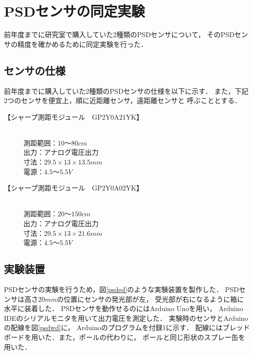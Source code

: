 \documentclass[10pt,a4j]{jarticle}
\begin{document}




\section{PSDセンサの同定実験}
\label{psdex}

前年度までに研究室で購入していた2種類のPSDセンサについて，
そのPSDセンサの精度を確かめるために同定実験を行った．

\subsection{センサの仕様}
前年度までに購入していた2種類のPSDセンサの仕様を以下に示す．
また，下記2つのセンサを便宜上，順に近距離センサ，遠距離センサと
呼ぶこととする．\\

 \begin{description}
  \item[【シャープ測距モジュール　GP2Y0A21YK】] \mbox{} \\
	     測距範囲：$10〜80\unit{cm}$ \\
	     出力：アナログ電圧出力 \\
	     寸法：$29.5×13×13.5\unit{mm}$ \\
	     電源：$4.5〜5.5\unit{V}$
  \item[【シャープ測距モジュール　GP2Y0A02YK】] \mbox{} \\
	     測距範囲：$20〜150\unit{cm}$ \\
	     出力：アナログ電圧出力 \\
	     寸法：$29.5×13×21.6\unit{mm}$ \\
	     電源：$4.5〜5.5\unit{V}$
 \end{description}


\subsection{実験装置}
PSDセンサの実験を行うため，図\ref{psded}のような実験装置を製作した．
PSDセンサは高さ$20\unit{mm}$の位置にセンサの発光部が左，
受光部が右になるように箱に水平に装着した．
PSDセンサを動作せるのにはArduino Unoを用い，
Arduino IDEのシリアルモニタを用いて出力電圧を測定した．
実験時のセンサとArduinoの配線を図\ref{psdwd}に，
Arduinoのプログラムを付録1に示す．
配線にはブレッドボードを用いた．また，ポールの代わりに，
ポールと同じ形状のスプレー缶を用いた．
\end{document}
